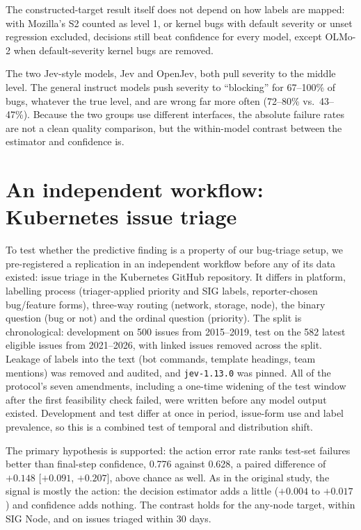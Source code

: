 The constructed-target result itself does not depend on how labels are
mapped: with Mozilla's S2
counted as level 1, or kernel bugs with default severity or unset
regression excluded, decisions still beat confidence for every model,
except OLMo-2 when default-severity kernel bugs are removed.

 The two Jev-style models,
Jev and OpenJev, both pull severity to the middle level. The general
instruct models push severity to ``blocking'' for 67--100\% of bugs,
whatever the true level, and are wrong far more often (72--80\%
vs.\ 43--47\%). Because the two groups use different interfaces, the
absolute failure rates are not a clean quality comparison, but the
within-model contrast between the estimator and confidence is.

\section{An independent workflow: Kubernetes issue triage}
\label{sec:k8s}

 To test whether the predictive finding is a property of
our bug-triage setup, we pre-registered a replication in an independent
workflow before any of its data existed: issue triage in the Kubernetes
GitHub repository. It differs in platform, labelling process
(triager-applied priority and SIG labels, reporter-chosen bug/feature
forms), three-way routing (network, storage, node), the binary question
(bug or not) and the ordinal question (priority). The split is
chronological: development on 500 issues from 2015--2019, test on the
582 latest eligible issues from 2021--2026, with linked issues removed
across the split. Leakage of labels into the text (bot commands, template
headings, team mentions) was removed and audited, and \texttt{jev-1.13.0}
was pinned. All of the protocol's seven amendments, including a one-time
widening of the test window after the first feasibility check failed,
were written before any model output existed. Development and test differ
at once in period, issue-form use and label prevalence, so this is a
combined test of temporal and distribution shift.

 The primary hypothesis is supported: the action error rate
ranks test-set failures better than final-step
confidence, 0.776 against 0.628, a paired difference of $+0.148$
[$+0.091$, $+0.207$], above chance as well. As in the original study,
the signal is mostly the action: the decision estimator adds a
little ($+0.004$ to $+0.017$) and confidence adds nothing. The contrast
holds for the any-node target, within SIG Node, and on issues triaged
within 30 days.

